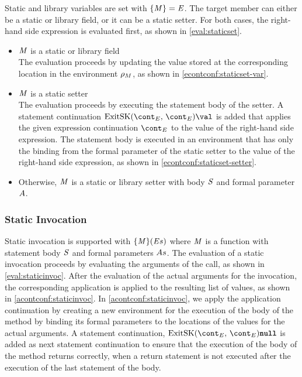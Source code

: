 \documentclass[a4paper,oneside,fleqn]{article}
\newcommand{\synt}[1]{\ensuremath{\text{\textbf{\texttt{#1}}}}}
\DeclareMathOperator{\nnull}{\synt{null}}
\begin{document}
Static and library variables are set with $\{\mathit{M}\}=\mathit{E}$.
The target member can either be a static or library field, or it can be a static setter. For both cases, the right-hand side expression is evaluated first, as shown in \eqref{eval:staticset}.

\begin{itemize}
    \item $\mathit{M}$ is a static or library field\\
        The evaluation proceeds by updating the value stored at the corresponding location in the environment $\rho_{M}$, as shown in \eqref{econtconf:staticset-var}.

    \item $\mathit{M}$ is a static setter\\
        The evaluation proceeds by executing the statement body of the setter.
        A statement continuation $\ExitSK{\econt}{\val}$ is added that applies the given expression continuation $\econt$ to the value of the right-hand side expression.
        The statement body is executed in an environment that has only the binding from the formal parameter of the static setter to the value of the right-hand side expression, as shown in \eqref{econtconf:staticset-setter}.

    \item Otherwise, $\mathit{M}$ is a static or library setter with body $\mathit{S}$ and formal parameter $A$.

\end{itemize}


\subsubsection{Static Invocation}
\label{subsubsec:static-invoc}

Static invocation is supported with $\{\mathit{M}\}(\mathit{E}{s})$ where $\mathit{M}$ is a function with statement body $\mathit{S}$ and formal parameters $As$.
The evaluation of a static invocation proceeds by evaluating the arguments of the call, as shown in \eqref{eval:staticinvoc}.
After the evaluation of the actual arguments for the invocation, the corresponding application is applied to the resulting list of values, as shown in \eqref{acontconf:staticinvoc}.
In \eqref{acontconf:staticinvoc}, we apply the application continuation by creating a new environment for the execution of the body of the method by binding its formal parameters to the locations of the values for the actual arguments.
A statement continuation, $\ExitSK{\econt}{\nnull}$ is added as next statement continuation to ensure that the execution of the body of the method returns correctly, when a return statement is not executed after the execution of the last statement of the body.
\end{document}
